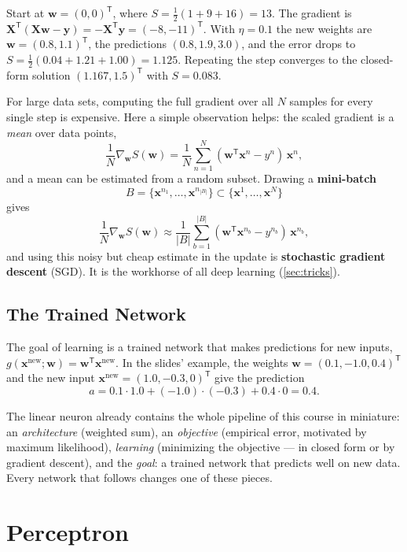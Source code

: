 \documentclass[11pt, oneside]{book}
\newcommand{\grad}{\nabla}               %
\newcommand{\T}{^{\mathsf{T}}}           %
\newcommand{\bx}{\bm{x}}        \newcommand{\by}{\bm{y}}
\newcommand{\bw}{\bm{w}}        \newcommand{\bW}{\bm{W}}
\newcommand{\bX}{\bm{X}}        \newcommand{\bY}{\bm{Y}}
\let\originalsection\section
\renewcommand{\section}{\Needspace{7\baselineskip}\originalsection}
\let\originalsubsection\subsection
\renewcommand{\subsection}{\Needspace{6\baselineskip}\originalsubsection}
\begin{document}
\begin{exbox}[title={One gradient step on the three points}]
Start at $\bw = (0,0)\T$, where $S = \frac12(1 + 9 + 16) = 13$. The gradient
is $\bX\T(\bX\bw - \by) = -\bX\T\by = (-8, -11)\T$. With $\eta = 0.1$ the new
weights are $\bw = (0.8, 1.1)\T$, the predictions $(0.8, 1.9, 3.0)$, and the
error drops to $S = \frac12(0.04 + 1.21 + 1.00) = 1.125$. Repeating the step
converges to the closed-form solution $(1.167, 1.5)\T$ with $S = 0.083$.
\end{exbox}

For large data sets, computing the full gradient over all $N$ samples for
every single step is expensive. Here a simple observation helps: the scaled
gradient is a \emph{mean} over data points,
\[
  \frac1N \grad_{\bw} S(\bw) = \frac1N\sum_{n=1}^{N} (\bw\T\bx^n - y^n)\,\bx^n,
\]
and a mean can be estimated from a random subset. Drawing a
\textbf{mini-batch}
\[
  B = \{\bx^{n_1}, \dots, \bx^{n_{|B|}}\} \subset \{\bx^1, \dots, \bx^N\}
\]
gives
\[
  \frac1N \grad_{\bw} S(\bw) \approx
  \frac{1}{|B|} \sum_{b=1}^{|B|} (\bw\T\bx^{n_b} - y^{n_b})\,\bx^{n_b},
\]
and using this noisy but cheap estimate in the update is \textbf{stochastic
gradient descent} (SGD). It is the workhorse of all deep learning
(\cref{sec:tricks}).

\subsection{The Trained Network}

The goal of learning is a trained network that makes predictions for new
inputs, $g(\bx^{\text{new}}; \bw) = \bw\T\bx^{\text{new}}$. In the slides'
example, the weights $\bw = (0.1, -1.0, 0.4)\T$ and the new input
$\bx^{\text{new}} = (1.0, -0.3, 0)\T$ give the prediction
\[
  a = 0.1\cdot 1.0 + (-1.0)\cdot(-0.3) + 0.4 \cdot 0 = 0.4 .
\]

\begin{intbox}
The linear neuron already contains the whole pipeline of this course in
miniature: an \emph{architecture} (weighted sum), an \emph{objective}
(empirical error, motivated by maximum likelihood), \emph{learning}
(minimizing the objective --- in closed form or by gradient descent), and
the \emph{goal}: a trained network that predicts well on new data. Every
network that follows changes one of these pieces.
\end{intbox}


\section{Perceptron}
\label{sec:perceptron}
\end{document}
